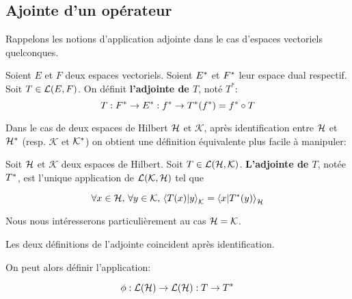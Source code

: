 \subsection{Ajointe d'un opérateur}

Rappelons les notions d'application adjointe dans le cas d'espaces vectoriels
quelconques.

\begin{definition}
	Soient $E$ et $F$ deux espaces vectoriels. Soient $E^{*}$ et
	$F^{*}$ leur espace dual respectif.
	Soit $T \in \mathcal{L}(E, F)$. On définit \textbf{l'adjointe de $T$},
	noté $T^{*}$:
	\begin{equation}
		T : F^{*} \rightarrow E^{*} : f^{*} \rightarrow T^{*}(f^{*})
	= f^{*} \circ T
		\label{def:adjointe_operator}
	\end{equation}
\end{definition}

Dans le cas de deux espaces de Hilbert $\mathcal{H}$ et $\mathcal{K}$, après
identification entre $\mathcal{H}$ et $\mathcal{H}^{*}$ (resp. $\mathcal{K}$ et
$\mathcal{K}^{*}$) on obtient une définition équivalente plus facile à
manipuler:

\begin{definition}
	Soit $\mathcal{H}$ et $\mathcal{K}$ deux espaces de Hilbert.
	Soit $T \in \mathcal{L}(\mathcal{H}, \mathcal{K})$.
	\textbf{L'adjointe de $T$}, notée $T^{*}$, est l'unique application
	de $\mathcal{L}(\mathcal{K}, \mathcal{H})$ tel que

	\begin{equation}
		\forall x \in \mathcal{H}, \, \forall y \in \mathcal{K}, \,
		{\bra{T(x)}\ket{y}}_{\mathcal{K}} = {\bra{x}\ket{T^{*}(y)}}_{\mathcal{H}}
	\end{equation}
\end{definition}

Nous nous intéresserons particulièrement au cas $\mathcal{H} = \mathcal{K}$.

\begin{proposition}
	Les deux définitions de l'adjointe coincident après identification.
\end{proposition}

On peut alors définir l'application:

\begin{equation}
	\phi : \mathcal{L}(\mathcal{H}) \rightarrow \mathcal{L}(\mathcal{H}) : T \rightarrow
	T^{*}
\end{equation}

